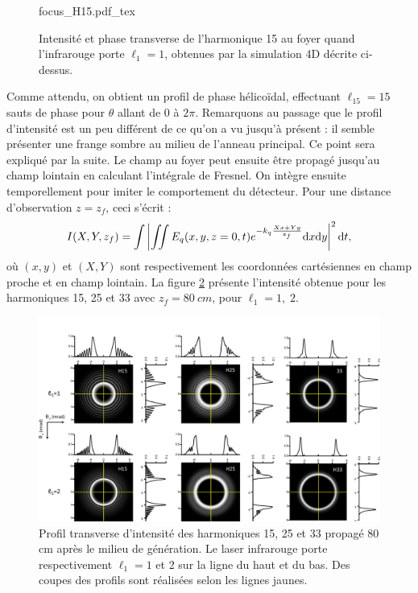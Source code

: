 \begin{figure}[!ht]
\centering
\def\svgwidth{.7\columnwidth}
{focus_H15.pdf_tex}
\caption{Intensité et phase transverse de l'harmonique 15 au foyer quand l'infrarouge porte $\ell_1=1$, obtenues par la simulation 4D décrite ci-dessus.}
\label{Fig:H15_simu}
\end{figure}
Comme attendu, on obtient un profil de phase hélicoïdal, effectuant $\ell_{15}=15$ sauts de phase pour $\theta$ allant de $0$ à $2\pi$. Remarquons au passage que le profil d'intensité est un peu différent de ce qu'on a vu jusqu'à présent : il semble présenter une frange sombre au milieu de l'anneau principal. Ce point sera expliqué par la suite. Le champ au foyer peut ensuite être propagé jusqu'au champ lointain en calculant l'intégrale de Fresnel. On intègre ensuite temporellement pour imiter le comportement du détecteur. Pour une distance d'observation $z=z_f$, ceci s'écrit :
\begin{align*}
I(X,Y,z_f)=\int\left| \iint E_{q}(x,y,z=0,t)e^{-k_{q}\frac{Xx+Yy}{\text{z}_{f}}}\mathrm{d} x\mathrm{d} y\right|^{2}\mathrm{d} t,
\end{align*}
où $(x,y)$ et $(X,Y)$ sont respectivement les coordonnées cartésiennes en champ proche et en champ lointain. La figure \ref{Fig:FarFieldSimu} présente l'intensité obtenue pour les harmoniques 15, 25 et 33 avec $z_f = \SI{80}{cm}$, pour $\ell_1 = 1,\; 2$.

\begin{figure}%
\includegraphics[width=\columnwidth]{Figures/Simul_LG_TA/FarFieldProfiles}%
\caption{Profil transverse d'intensité des harmoniques 15, 25 et 33 propagé 80 cm après le milieu de génération. Le laser infrarouge porte respectivement $\ell_1=1$ et 2 sur la ligne du haut et du bas. Des coupes des profils sont réalisées selon les lignes jaunes.}%
\label{Fig:FarFieldSimu}%
\end{figure}


